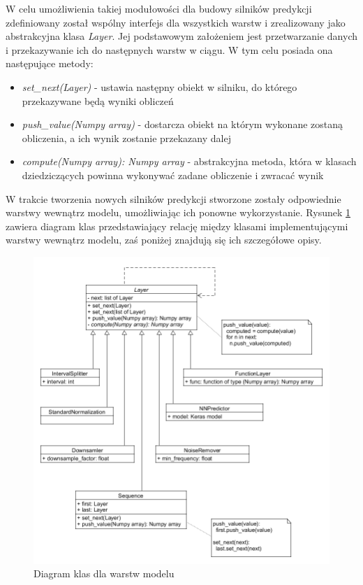 \documentclass[polish,12pt]{aghthesis}
\begin{document}
W celu umożliwienia takiej modułowości dla budowy silników predykcji zdefiniowany został wspólny interfejs dla wszystkich warstw i zrealizowany jako abstrakcyjna klasa \emph{Layer}. Jej podstawowym założeniem jest przetwarzanie danych i przekazywanie ich do następnych warstw w ciągu. W tym celu posiada ona następujące metody:

\begin{itemize}
	\itemsep0em
	\item[] \emph{set\_next(Layer)} - ustawia następny obiekt w silniku, do którego przekazywane będą wyniki obliczeń
	\item[] \emph{push\_value(Numpy array)} - dostarcza obiekt na którym wykonane zostaną obliczenia, a ich wynik zostanie przekazany dalej
	\item[] \emph{compute(Numpy array): Numpy array} - abstrakcyjna metoda, która w klasach dziedziczących powinna wykonywać zadane obliczenie i zwracać wynik
\end{itemize}

W trakcie tworzenia nowych silników predykcji stworzone zostały odpowiednie warstwy wewnątrz modelu, umożliwiając ich ponowne wykorzystanie. Rysunek \ref{fig:pipes_uml} zawiera diagram klas przedstawiający relację między klasami implementującymi  warstwy wewnątrz modelu, zaś poniżej znajdują się ich szczegółowe opisy.

\begin{figure}[h!]
	\centering
	\includegraphics[width=0.8\linewidth]{pipes_uml.png}
	\caption{Diagram klas dla warstw modelu}
	\label{fig:pipes_uml}
\end{figure}
\end{document}
